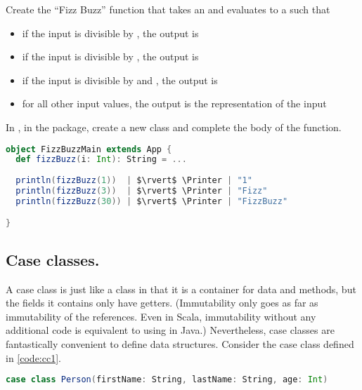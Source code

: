 \documentclass[10 pt]{article}
\begin{document}
\begin{example}
Create the ``Fizz Buzz'' function that takes an  and evaluates to a  such that 
\begin{itemize}
  \item if the input is divisible by , the output is 
  \item if the input is divisible by , the output is 
  \item if the input is divisible by  and , the output is 
  \item for all other input values, the output is the  representation of the input
\end{itemize}

In , in the  package, create a new class  and complete the body of the  function.

\begin{lstlisting}[caption={Fizz Buzz}, label={code:fb}, language=Scala, escapechar=|]
object FizzBuzzMain extends App {
  def fizzBuzz(i: Int): String = ...
  
  println(fizzBuzz(1))  | $\rvert$ \Printer | "1"
  println(fizzBuzz(3))  | $\rvert$ \Printer | "Fizz"
  println(fizzBuzz(30)) | $\rvert$ \Printer | "FizzBuzz"

}
\end{lstlisting}
\end{example}

\subsection{Case classes.} A case class is just like a class in that it is a container for data and methods, but the fields it contains only have getters. (Immutability only goes as far as immutability of the references. Even in Scala, immutability without any additional code is equivalent to using  in Java.) Nevertheless, case classes are fantastically convenient to define data structures. Consider the  case class defined in \autoref{code:cc1}.

\begin{lstlisting}[caption={Case class \pcode{Person}}, label={code:cc1}, language=Scala, escapechar=|]
case class Person(firstName: String, lastName: String, age: Int)
\end{lstlisting}
\end{document}
